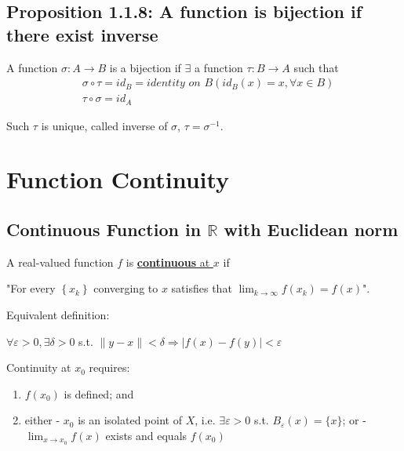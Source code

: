 \documentclass[11pt]{elegantbook}
\begin{document}
\subsection{Proposition 1.1.8: A function is bijection if there exist inverse}
\begin{proposition}[Proposition 1.1.8]
    A function $\sigma:A \rightarrow B$ is a bijection if $\exists$ a function $\tau:B \rightarrow A $ such that
    \begin{equation}
        \begin{aligned}
            &\sigma\circ\tau=id_B=\textit{identity on }B(id_B(x)=x, \forall x\in B)\\
            &\tau\circ\sigma=id_A
        \end{aligned}
        \nonumber
    \end{equation}
\end{proposition}
Such $\tau$ is unique, called inverse of $\sigma$, $\tau=\sigma^{-1}$.

\section{Function Continuity}

\subsection{Continuous Function in $\mathbb{R}$ with Euclidean norm}
\begin{definition}
    \normalfont
    A real-valued function $f$ is \underline{\textbf{continuous} at $x$} if
    
    "For every $\left\{x_{k}\right\}$ converging to $x$ satisfies that $\lim _{k \rightarrow \infty} f\left(x_{k}\right)=f(x)$".

    Equivalent definition:

    $\forall \varepsilon>0, \exists \delta>0$ s.t.
    $\|y-x\|<\delta \Rightarrow |f(x)-f(y)|<\varepsilon$
\end{definition}
Continuity at $x_0$ requires:
\begin{enumerate}
    \item $f(x_0)$ is defined; and
    \item either
    \subitem - $x_0$ is an isolated point of $X$, i.e. $\exists \varepsilon > 0$ s.t. $B_\varepsilon(x) = \{x\}$; or
    \subitem - $\lim_{x \rightarrow x_0} f(x)$ exists and equals $f(x_0)$
\end{enumerate}
\end{document}
